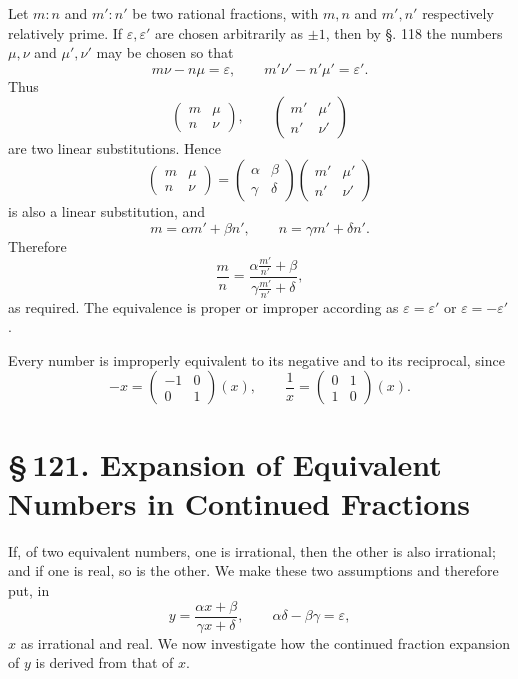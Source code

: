 \documentclass[11pt]{article}
\providecommand{\sect}[2]{\section*{\S\,#1. #2}}
\begin{document}
Let $m:n$ and $m':n'$ be two rational fractions, with $m,n$ and $m',n'$ respectively relatively prime. If $\varepsilon,\varepsilon'$ are chosen arbitrarily as $\pm1$, then by §. 118 the numbers $\mu,\nu$ and $\mu',\nu'$ may be chosen so that
\[
        m\nu-n\mu=\varepsilon,
        \qquad
        m'\nu'-n'\mu'=\varepsilon'.
\]
Thus
\[
        \begin{pmatrix}m&\mu\\ n&\nu\end{pmatrix},
        \qquad
        \begin{pmatrix}m'&\mu'\\ n'&\nu'\end{pmatrix}
\]
are two linear substitutions. Hence
\[
        \begin{pmatrix}m&\mu\\ n&\nu\end{pmatrix}
        =\begin{pmatrix}\alpha&\beta\\ \gamma&\delta\end{pmatrix}
         \begin{pmatrix}m'&\mu'\\ n'&\nu'\end{pmatrix}
\]
is also a linear substitution, and
\[
        m=\alpha m'+\beta n',
        \qquad
        n=\gamma m'+\delta n'.
\]
Therefore
\[
        \frac mn=\frac{\alpha\frac{m'}{n'}+\beta}{\gamma\frac{m'}{n'}+\delta},
\]
as required. The equivalence is proper or improper according as $\varepsilon=\varepsilon'$ or $\varepsilon=-\varepsilon'$.

Every number is improperly equivalent to its negative and to its reciprocal, since
\[
        -x=\begin{pmatrix}-1&0\\0&1\end{pmatrix}(x),
        \qquad
        \frac1x=\begin{pmatrix}0&1\\1&0\end{pmatrix}(x).
\]

\sect{121}{Expansion of Equivalent Numbers in Continued Fractions}

If, of two equivalent numbers, one is irrational, then the other is also irrational; and if one is real, so is the other. We make these two assumptions and therefore put, in
\[
\tag{1}        y=\frac{\alpha x+\beta}{\gamma x+\delta},
        \qquad
        \alpha\delta-\beta\gamma=\varepsilon,
\]
$x$ as irrational and real. We now investigate how the continued fraction expansion of $y$ is derived from that of $x$.
\end{document}
